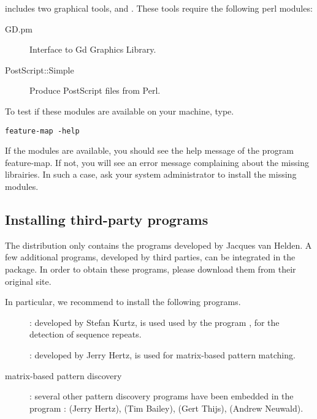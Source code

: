\documentclass{article}
\begin{document}
\RSAT includes two graphical tools,  and
. These tools require the following  perl modules: 

\begin{description}
\item[GD.pm] Interface to Gd Graphics Library.
\item[PostScript::Simple]  Produce PostScript files from Perl.
\end{description}

To test if these modules are available on your machine, type.

\begin{verbatim}
feature-map -help
\end{verbatim}

If the modules are available, you should see the help message of the
program feature-map. If not, you will see an error message complaining
about the missing librairies. In such a case, ask your system
administrator to install the missing modules.

\subsection{Installing third-party programs}

The \RSAT distribution only contains the programs developed by Jacques
van Helden. A few additional programs, developed by third parties, can
be integrated in the package. In order to obtain these programs,
please download them from their original site.

In particular, we recommend to install the following programs.

\begin{description}
\item[]: developed by Stefan Kurtz, is used used by the
program , for the detection of sequence repeats.

\item[]: developed by Jerry Hertz, is used for
  matrix-based pattern matching.

\item[matrix-based pattern discovery]: several other pattern discovery
  programs have been embedded in the \RSAT program
  : 
 (Jerry Hertz),
 (Tim Bailey),
 (Gert Thijs),
 (Andrew Neuwald).

\end{description}
\end{document}
